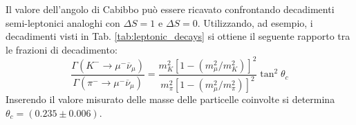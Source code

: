 \documentclass{subnucbo}
\begin{document}
Il valore dell'angolo di Cabibbo può essere ricavato confrontando decadimenti semi-leptonici analoghi con $\Delta S = 1$ e $\Delta S = 0$. Utilizzando, ad esempio, i decadimenti visti in Tab. \ref{tab:leptonic_decays} si ottiene il seguente rapporto tra le frazioni di decadimento:
\begin{equation}
        \frac { \Gamma \left( K ^ { - } \rightarrow \mu ^ { - } \overline\nu _ { \mu } \right) } { \Gamma \left( \pi ^ { - } \rightarrow \mu ^ { - } \overline \nu _ { \mu } \right) } = \frac { m _ { K } ^ { 2 } \left[ 1 - \left( m _ { \mu } ^ { 2 } / m _ { K } ^ { 2 } \right) \right] ^ { 2 } } { m _ { \pi } ^ { 2 } \left[ 1 - \left( m _ { \mu } ^ { 2 } / m _ { \pi } ^ { 2 } \right) \right] ^ { 2 } } \tan ^ { 2 } \theta _ { c }
\end{equation}
Inserendo il valore misurato delle masse delle particelle coinvolte si determina $\theta_{c} = (0.235 \pm 0.006)$.
\end{document}
